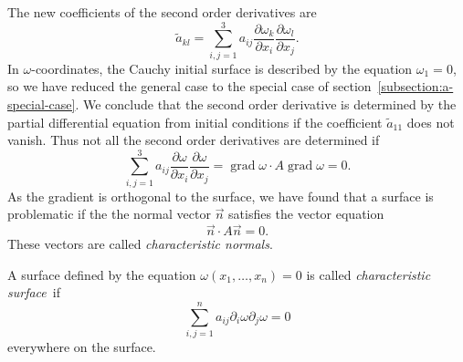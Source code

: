 The new coefficients of the second order derivatives are
\[
\tilde a_{kl}=
\sum_{i,j=1}^3a_{ij}
\frac{\partial\omega_k}{\partial x_i}
\frac{\partial\omega_l}{\partial x_j}.
\]
In $\omega$-coordinates, the Cauchy initial surface is described by
the equation $\omega_1=0$, so we have reduced the general case
to the special case of section~\ref{subsection:a-special-case}.
We conclude that the second order derivative is determined by the
partial differential equation from initial conditions if the 
coefficient $\tilde a_{11}$ does not vanish.
Thus not all the second order derivatives are determined if
\[
\sum_{i,j=1}^3
a_{ij}
\frac{\partial\omega}{\partial x_i}
\frac{\partial\omega}{\partial x_j}
=
\operatorname{grad}\omega
\cdot
A
\operatorname{grad}\omega
=0.
\]
As the gradient is orthogonal to the surface, we have found that a
surface is problematic if the the normal vector $\vec{n}$ satisfies
the vector equation
\[
\vec n\cdot A\vec n=0.
\]
These vectors are called {\em characteristic normals}.

\begin{definition}
A surface defined by the equation
$\omega(x_1,\dots,x_n)=0$
is called {\em characteristic surface} if 
\[
\sum_{i,j=1}^na_{ij}\partial_i\omega\partial_j\omega=0
\]
everywhere on the surface.
\end{definition}


